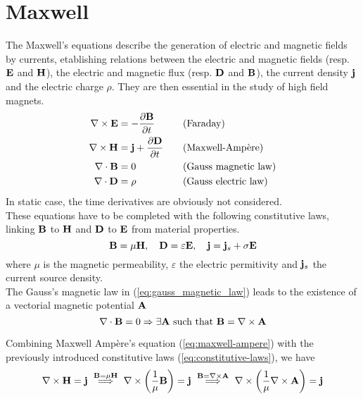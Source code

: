\section{Maxwell}
The Maxwell's equations describe the generation of electric and magnetic fields
by currents, etablishing relations between the electric and magnetic fields
(resp. $\mathbf{E}$ and $\mathbf{H}$), the electric and magnetic flux (resp. $\mathbf{D}$ and $\mathbf{B}$),
the current density $\mathbf{j}$ and the electric charge $\rho$. They are then
essential in the study of high field magnets.
\begin{alignat}{2}
  \nabla \times \mathbf{E} &= -\frac{\partial \mathbf{B}}{\partial t}
  &&\quad\text{(Faraday)} \label{eq:faraday} \\
  \nabla \times \mathbf{H} &= \mathbf{j} +\frac{\partial \mathbf{D}}{\partial t}
  &&\quad\text{(Maxwell-Ampère)} \label{eq:maxwell-ampere} \\
  \nabla \cdot \mathbf{B} &= 0
  &&\quad\text{(Gauss magnetic law)} \label{eq:gauss_magnetic_law} \\
  \nabla \cdot \mathbf{D} &= \rho
  &&\quad\text{(Gauss electric law)} \label{eq:gauss_electric_law}
\end{alignat}
In static case, the time derivatives are obviously not considered. \\

These equations have to be completed with the following constitutive laws,
linking $\mathbf{B}$ to $\mathbf{H}$ and $\mathbf{D}$ to $\mathbf{E}$ from material properties.
\begin{equation}
  \label{eq:constitutive-laws}
  \mathbf{B} = \mu \mathbf{H}, \quad \mathbf{D} = \varepsilon \mathbf{E}, \quad \mathbf{j} = \mathbf{j}_s + \sigma \mathbf{E}
\end{equation}
where $\mu$ is the magnetic permeability, $\varepsilon$ the electric permitivity
and $\mathbf{j}_s$ the current source density. \\

The Gauss's magnetic law in (\ref{eq:gauss_magnetic_law}) leads to the existence
of a vectorial magnetic potential $\mathbf{A}$
\begin{equation}
  \label{eq:magnetic-potential}
  \nabla\cdot\mathbf{B}=0 \Rightarrow\exists\mathbf{A}\text{ such that }\mathbf{B} = \nabla\times\mathbf{A}
\end{equation}

Combining Maxwell Ampère's equation (\ref{eq:maxwell-ampere}) with the
previously introduced constitutive laws (\ref{eq:constitutive-laws}), we have
\begin{equation}
  \nabla \times \mathbf{H} = \mathbf{j}
    ~\overset{ {\scriptstyle \mathbf{B} = \mu \mathbf{H}} }{ \Longrightarrow }
    ~\nabla \times \left( \frac{1}{\mu} \mathbf{B} \right) = \mathbf{j}
    ~\overset{ {\scriptstyle\mathbf{B} = \nabla \times \mathbf{A}} }{ \Longrightarrow }
    ~\nabla \times \left( \frac{1}{\mu} \nabla \times \mathbf{A} \right) = \mathbf{j}
\end{equation}

